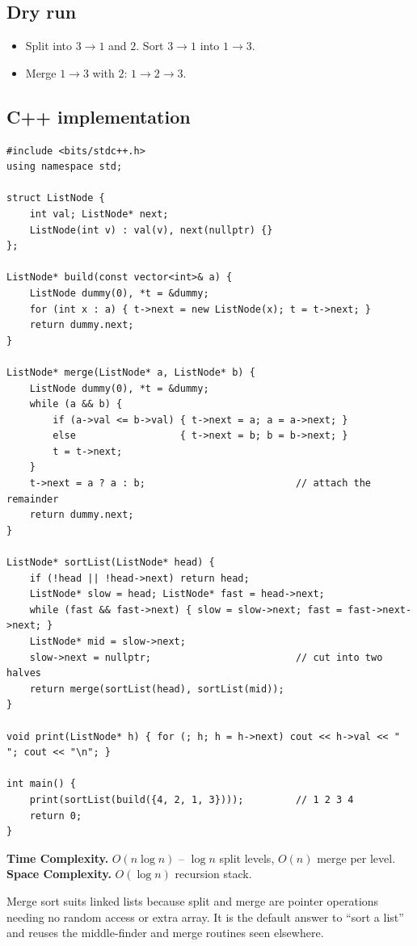 \subsection*{Dry run}


\begin{itemize}
  \item Split into $3\to1$ and $2$. Sort $3\to1$ into $1\to3$.
  \item Merge $1\to3$ with $2$: $1\to2\to3$.
\end{itemize}

\subsection*{C++ implementation}

\begin{lstlisting}
#include <bits/stdc++.h>
using namespace std;

struct ListNode {
    int val; ListNode* next;
    ListNode(int v) : val(v), next(nullptr) {}
};

ListNode* build(const vector<int>& a) {
    ListNode dummy(0), *t = &dummy;
    for (int x : a) { t->next = new ListNode(x); t = t->next; }
    return dummy.next;
}

ListNode* merge(ListNode* a, ListNode* b) {
    ListNode dummy(0), *t = &dummy;
    while (a && b) {
        if (a->val <= b->val) { t->next = a; a = a->next; }
        else                  { t->next = b; b = b->next; }
        t = t->next;
    }
    t->next = a ? a : b;                          // attach the remainder
    return dummy.next;
}

ListNode* sortList(ListNode* head) {
    if (!head || !head->next) return head;
    ListNode* slow = head; ListNode* fast = head->next;
    while (fast && fast->next) { slow = slow->next; fast = fast->next->next; }
    ListNode* mid = slow->next;
    slow->next = nullptr;                         // cut into two halves
    return merge(sortList(head), sortList(mid));
}

void print(ListNode* h) { for (; h; h = h->next) cout << h->val << " "; cout << "\n"; }

int main() {
    print(sortList(build({4, 2, 1, 3})));         // 1 2 3 4
    return 0;
}
\end{lstlisting}

\begin{complexitybox}
\textbf{Time Complexity.} $O(n\log n)$ -- $\log n$ split levels, $O(n)$
merge per level. \textbf{Space Complexity.} $O(\log n)$ recursion stack.
\end{complexitybox}

\begin{takeawaybox}
Merge sort suits linked lists because split and merge are pointer
operations needing no random access or extra array. It is the default
answer to ``sort a list'' and reuses the middle-finder and merge routines
seen elsewhere.
\end{takeawaybox}
